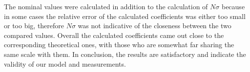 \documentclass[reprint,amsmath,amssymb,aps, prl]{revtex4-2}
\begin{document}
The nominal values were calculated in addition to the calculation of $N\sigma$ because in some cases the relative error of the calculated coefficients was either too small or too big, therefore $N\sigma$ was not indicative of the closeness between the two compared values. Overall the calculated coefficients came out close to the corresponding theoretical ones, with those who are somewhat far sharing the same scale with them. In conclusion, the results are satisfactory and indicate the validity of our model and measurements.


\end{document}
